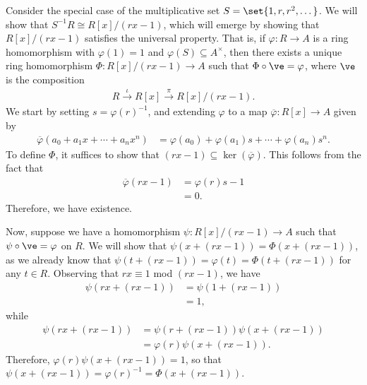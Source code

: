 \documentclass[10pt]{mypackage}
\begin{document}
\begin{example}
 Consider the special case of the multiplicative set $S = \set{1,r,r^2,\dots}$. We will show that $S^{-1}R \cong R[x]/\left( rx-1 \right)$, which will emerge by showing that $R[x]/\left( rx-1 \right)$ satisfies the universal property. That is, if $\varphi\colon R\rightarrow A$ is a ring homomorphism with $\varphi\left( 1 \right) = 1$ and $\varphi(S)\subseteq A^{\times}$, then there exists a unique ring homomorphism $ \Phi\colon R[x]/\left( rx-1 \right) \rightarrow A $ such that $\Phi\circ \ve = \varphi$, where $\ve$ is the composition
\begin{align*}
  R\xrightarrow{\iota} R[x] \xrightarrow{\pi} R[x]/\left( rx-1 \right).
\end{align*}
We start by setting $s = \varphi(r)^{-1}$, and extending $\varphi$ to a map $ \overline{\varphi}\colon R[x]\rightarrow A $ given by
\begin{align*}
  \overline{\varphi}\left( a_0 + a_1 x + \cdots + a_nx^{n} \right) &= \varphi\left( a_0 \right) + \varphi\left( a_1 \right)s + \cdots + \varphi\left( a_n \right)s^{n}.
\end{align*}
To define $ \Phi $, it suffices to show that $\left( rx-1 \right)\subseteq \ker\left( \overline{\varphi} \right)$. This follows from the fact that
\begin{align*}
  \overline{\varphi}\left( rx-1 \right) &= \varphi\left( r \right)s-1\\
                                        &= 0.
\end{align*}
Therefore, we have existence.

Now, suppose we have a homomorphism $\psi\colon R[x]/\left( rx-1 \right)\rightarrow A$ such that $ \psi\circ\ve = \varphi $ on $R$. We will show that $\psi\left( x + \left( rx-1 \right) \right) = \Phi\left( x + \left( rx-1 \right) \right)$, as we already know that $\psi\left( t + \left( rx-1 \right) \right) = \varphi(t) = \Phi\left( t + \left( rx-1 \right) \right)$ for any $t\in R$. Observing that $rx\equiv 1$ mod $\left( rx-1 \right)$, we have
\begin{align*}
  \psi\left( rx + \left( rx-1 \right) \right) &= \psi\left( 1 + \left( rx-1 \right) \right)\\
                                              &= 1,
\end{align*}
while
\begin{align*}
  \psi\left( rx + \left( rx-1 \right) \right) &= \psi\left( r + \left( rx-1 \right) \right) \psi\left( x + \left( rx-1 \right) \right)\\
                                              &= \varphi\left( r \right) \psi\left( x + \left( rx-1 \right) \right).
\end{align*}
Therefore, $\varphi\left( r \right) \psi\left( x + \left( rx-1 \right) \right) = 1$, so that $\psi\left( x + \left( rx-1 \right) \right) = \varphi\left( r \right)^{-1} = \Phi\left( x + \left( rx-1 \right) \right)$. 
\end{example}
\end{document}

